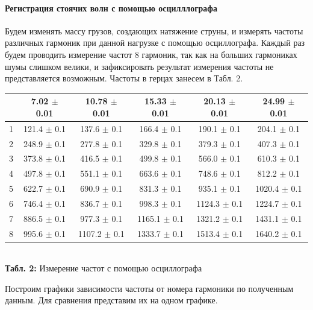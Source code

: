 \documentclass[12pt,a4paper]{scrartcl}
\begin{document}
	\paragraph{Регистрация стоячих волн с помощью осцилллографа} \hfill
	
	\par Будем изменять массу грузов, создающих натяжение струны, и измерять частоты различных гармоник при данной нагрузке с помощью осциллографа. Каждый раз будем проводить измерение частот 8 гармоник, так как на больших гармониках шумы слишком велики, и зафиксировать результат измерения частоты не представляется возможным. Частоты в герцах занесем в Табл. 2.
	
	\begin{center}
		\begin{tabular}{|c|c|c|c|c|c|}
			\hline
			\backslashbox{№}{$T$, Н} & 7.02 $\pm$ 0.01 & 10.78 $\pm$ 0.01 & 15.33 $\pm$ 0.01 & 20.13 $\pm$ 0.01 & 24.99 $\pm$ 0.01
			\\\hline
			1 & 121.4 $\pm$ 0.1 & 137.6 $\pm$ 0.1 & 166.4 $\pm$ 0.1 & 190.1 $\pm$ 0.1 & 204.1 $\pm$ 0.1 
			\\\hline
			2 & 248.9 $\pm$ 0.1 & 277.8 $\pm$ 0.1 & 329.8 $\pm$ 0.1 & 379.3 $\pm$ 0.1 & 407.3 $\pm$ 0.1 
			\\\hline
			3 & 373.8 $\pm$ 0.1 & 416.5 $\pm$ 0.1 & 499.8 $\pm$ 0.1 & 566.0 $\pm$ 0.1 & 610.3 $\pm$ 0.1 
			\\\hline
			4 & 497.8 $\pm$ 0.1 & 551.1 $\pm$ 0.1 & 663.6 $\pm$ 0.1 & 748.6 $\pm$ 0.1 & 812.2 $\pm$ 0.1 
			\\\hline
			5 & 622.7 $\pm$ 0.1 & 690.9 $\pm$ 0.1 & 831.3 $\pm$ 0.1 & 935.1 $\pm$ 0.1 & 1020.4 $\pm$ 0.1 
			\\\hline
			6 & 746.4 $\pm$ 0.1 & 836.7 $\pm$ 0.1 & 998.3 $\pm$ 0.1 & 1124.3 $\pm$ 0.1 & 1224.7 $\pm$ 0.1 
			\\\hline
			7 & 886.5 $\pm$ 0.1 & 977.3 $\pm$ 0.1 & 1165.1 $\pm$ 0.1 & 1321.2 $\pm$ 0.1 & 1431.1 $\pm$ 0.1 
			\\\hline
			8 & 995.6 $\pm$ 0.1 & 1107.2 $\pm$ 0.1 & 1333.7 $\pm$ 0.1 & 1513.4 $\pm$ 0.1 & 1640.2 $\pm$ 0.1 
			\\\hline
		\end{tabular}
		\\\textbf{Табл. 2: } Измерение частот с помощью осциллографа
	\end{center}

	Построим графики зависимости частоты от номера гармоники по полученным данным. Для сравнения представим их на одном графике.
	
\end{document}

